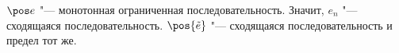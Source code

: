 
$\pos e$ "--- монотонная ограниченная последовательность. Значит,
$e_n$ "--- сходящаяся последовательность. $\pos{\tilde e}$ "--- сходящаяся последовательность и предел тот же.
